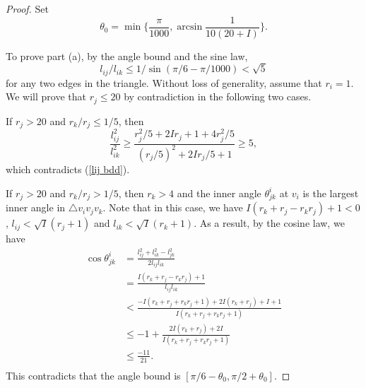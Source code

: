 \documentclass[10pt,a4paper]{amsart}
\begin{document}
\begin{proof}
    Set $$\theta_{0} = \min \{\frac{\pi}{1000}, \arcsin \frac{1}{10(20+I)}\}.$$


	To prove part (a), by the angle bound and the sine law,
\begin{equation}\label{lij bdd}
  l_{ij}/l_{ik}\leq 1 /\sin (\pi /6 - \pi /1000)< \sqrt{5}
\end{equation}
 for any two edges in the triangle.
 Without loss of generality, assume that $r_i = 1$. We will prove that $r_j\leq 20$ by contradiction in the following two cases.
	
	If $r_j>20$ and $r_k/r_j\leq 1/5$, then
	$$\frac{l_{ij}^2}{l_{ik}^2} \geq \frac{r_j^2/5 + 2Ir_j+ 1+  4r_j^2/5}{(r_j/5)^2 + 2Ir_j/5+ 1} \geq 5,$$
	which contradicts (\ref{lij bdd}).
	
	If $r_j>20$ and $r_k/r_j> 1/5$, then $r_k>4$ and the inner angle $\theta_{jk}^i$ at $v_i$ is the largest inner angle in $\triangle v_iv_jv_k$.
Note that in this case, we have $I({r_k} + {r_j} - {r_k}{r_j}) + 1<0$, $l_{ij}<\sqrt{I}(r_j+1)$ and $l_{ik}<\sqrt{I}(r_k+1)$.
As a result, by the cosine law, we have
	    $$
	\begin{aligned}
		\cos \theta _{jk}^i &  = \frac{{l_{ij}^2 + l_{ik}^2 - l_{jk}^2}}{{2{l_{ij}}{l_{ik}}}} \\
&= \frac{{I({r_k} + {r_j} - {r_k}{r_j}) + 1}}{{{l_{ij}}{l_{ik}}}} \\
		&  < \frac{{ - I({r_k} + {r_j} + {r_k}{r_j} + 1) + 2I({r_k} + {r_j}) + I + 1}}{{I({r_k} + {r_j} + {r_k}{r_j} + 1)}}
		\\
		& \le   - 1 + \frac{{2I({r_k} + {r_j}) + 2I}}{{I({r_k} + {r_j} + {r_k}{r_j} + 1)}}\\
& \le \frac{{ - 11}}{{21}}.\\
	\end{aligned}
	$$
	This contradicts that the angle bound is $[\pi /6 - \theta_0,  \pi/2 + \theta_0]$.

	
	

\end{proof}
\end{document}
